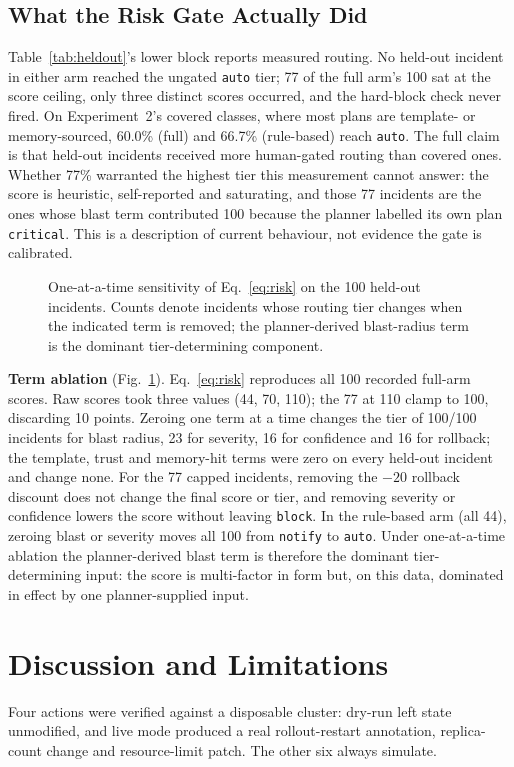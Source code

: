 \documentclass[conference]{IEEEtran}
\begin{document}
\subsection{What the Risk Gate Actually Did}
\label{sec:riskgate}
Table~\ref{tab:heldout}'s lower block reports measured routing. No
held-out incident in either arm reached the ungated \texttt{auto} tier;
77 of the full arm's 100 sat at the score ceiling, only three distinct
scores occurred, and the hard-block check never fired. On Experiment~2's
covered classes, where most plans are template- or memory-sourced,
60.0\% (full) and 66.7\% (rule-based) reach \texttt{auto}. The full claim
is that held-out incidents received more human-gated routing than
covered ones. Whether 77\% warranted the highest tier this measurement
cannot answer: the score is heuristic, self-reported and saturating, and
those 77 incidents are the ones whose blast term contributed 100
because the planner labelled its own plan \texttt{critical}. This is a description of current behaviour, not
evidence the gate is calibrated.

\begin{figure}[!t]
\centering

\caption{One-at-a-time sensitivity of Eq.~\eqref{eq:risk} on the 100
held-out incidents. Counts denote incidents whose routing tier changes
when the indicated term is removed; the planner-derived blast-radius
term is the dominant tier-determining component.}
\label{fig:riskablation}
\end{figure}

\textbf{Term ablation} (Fig.~\ref{fig:riskablation}).
Eq.~\eqref{eq:risk} reproduces all 100 recorded
full-arm scores. Raw scores took three values (44, 70, 110); the 77 at
110 clamp to 100, discarding 10 points. Zeroing one term at a time
changes the tier of 100/100 incidents for blast radius, 23 for severity,
16 for confidence and 16 for rollback; the template, trust and
memory-hit terms were zero on every held-out incident and change none.
For the 77 capped incidents, removing the $-20$ rollback discount does
not change the final score or tier, and removing severity or confidence
lowers the score without leaving \texttt{block}. In the rule-based arm (all 44), zeroing blast or severity
moves all 100 from \texttt{notify} to \texttt{auto}. Under one-at-a-time
ablation the planner-derived blast term is therefore the dominant
tier-determining input: the score is multi-factor in form but, on this
data, dominated in effect by one planner-supplied input.

\section{Discussion and Limitations}
\label{sec:limits}
Four actions were verified against a disposable cluster: dry-run left
state unmodified, and live mode produced a real rollout-restart
annotation, replica-count change and resource-limit patch. The other six
always simulate.
\end{document}
